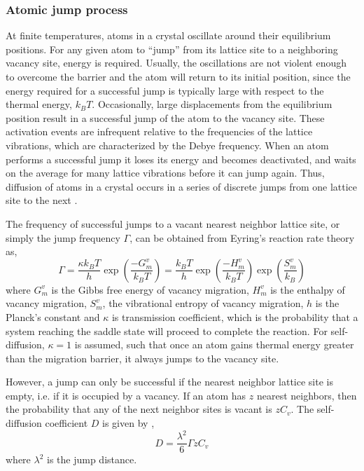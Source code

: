 \documentclass{article}
\begin{document}
\subsubsection{Atomic jump process}

At finite temperatures, atoms in a crystal oscillate around their equilibrium positions. For any given atom to \enquote{jump} from its lattice site to a neighboring vacancy site, energy is required. Usually, the oscillations are not violent enough to overcome the barrier and the atom will return to its initial position, since the energy required for a successful jump is typically large with respect to the thermal energy, $k_BT$.  Occasionally, large displacements from the equilibrium position result in a successful jump of the atom to the vacancy site. These activation events are infrequent relative to the frequencies of the lattice vibrations, which are characterized by the Debye frequency. When an atom performs a successful jump it loses its energy and becomes deactivated, and waits on the average for many lattice vibrations before it can jump again. Thus, diffusion of atoms in a crystal occurs in a series of discrete jumps from one lattice site to the next \cite{Mehrer2007}.

The frequency of successful jumps to a vacant nearest neighbor lattice site, or simply the jump frequency $\Gamma$, can be obtained from Eyring's reaction rate theory \cite{Eyring1935} as,
%
\begin{equation} \label{eq:2}
\Gamma = \dfrac{\kappa k_B T}{h} \exp\left(\dfrac{-G^v_m}{k_B T}\right) =\dfrac{k_B T}{h} \exp\left(\dfrac{-H^v_m}{k_B T}\right) \exp\left(\dfrac{S^v_m}{k_B}\right)
\end{equation}
%
where $G^v_m$ is the Gibbs free energy of vacancy migration, $H^v_m$ is the enthalpy of vacancy migration, $S^v_m$, the vibrational entropy of vacancy migration, $h$ is the Planck's constant and $\kappa$ is transmission coefficient, which is the probability that a system reaching the saddle state will proceed to complete the reaction. For self-diffusion, $\kappa=1$ is assumed, such that once an atom gains thermal energy greater than the migration barrier, it always jumps to the vacancy site.

However, a jump can only be successful if the nearest neighbor lattice site is empty, i.e. if it is occupied by a vacancy. If an atom has $z$ nearest neighbors, then the probability that any of the next neighbor sites is vacant is $z C_v$. The self-diffusion coefficient $D$ is given by \cite{Gottstein2004},
%
\begin{equation} \label{eq:3}
D = \dfrac{\lambda^2}{6} \Gamma z C_v 
\end{equation}
%
where $\lambda^2$ is the jump distance.
\end{document}
